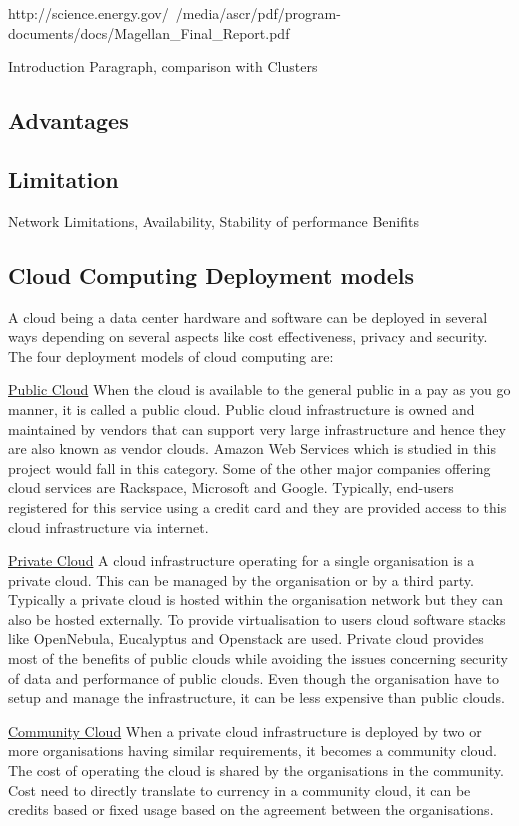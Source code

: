 \documentclass[12pt,a4paper]{report}
\begin{document}
http://science.energy.gov/~/media/ascr/pdf/program-documents/docs/Magellan_Final_Report.pdf  

Introduction Paragraph, comparison with Clusters  
\subsection{Advantages}  
\subsection{Limitation}  
Network Limitations, Availability, Stability of performance  
Benifits  

\subsection{Cloud Computing Deployment models}  
A cloud being a data center hardware and software can be deployed in several ways depending on several aspects like cost effectiveness, privacy and security. The four deployment models of cloud computing are:  

\underline{ Public Cloud}  
When the cloud is available to the general public in a pay as you go manner, it is called a public cloud. 
Public cloud infrastructure is owned and maintained by vendors that can support very large infrastructure and hence they are also known as vendor clouds. 
Amazon Web Services\cite{} which is studied in this project would fall in this category. 
Some of the other major companies offering cloud services are Rackspace\cite{}, Microsoft\cite{} and Google\cite{}. 
Typically, end-users registered for this service using a credit card and they are provided access to this cloud infrastructure via internet.  

\underline{Private Cloud}  
A cloud infrastructure operating for a single organisation is a private cloud. This can be managed by the organisation or by a third party. 
Typically a private cloud is hosted within the organisation network but they can also be hosted externally. 
To provide virtualisation to users cloud software stacks like OpenNebula, Eucalyptus and Openstack are used. 
Private cloud provides most of the benefits of public clouds while avoiding the issues concerning security of data and performance of public clouds. 
Even though the organisation have to setup and manage the infrastructure,  it can be less expensive than public clouds\cite{Magellan_Final_Report.pdf}.

\underline{ Community Cloud}  
When a private cloud infrastructure is deployed by two or more organisations having similar requirements, it becomes a community cloud. 
The cost of operating the cloud is shared by the organisations in the community. 
Cost need to directly translate to currency in a community cloud, it can be credits based or fixed usage based on the agreement between the organisations.  
\end{document}
